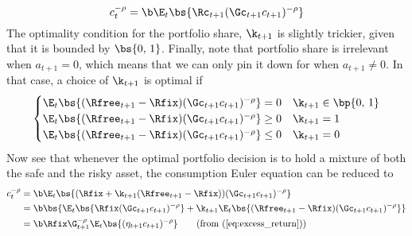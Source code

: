 \begin{equation}\label{eq:euler}
    c_t^{-\rho} = \b \E_{t}\bs{\Rc_{t+1}(\Gc_{t+1}c_{t+1})^{-\rho}}
\end{equation}
The optimality condition for the portfolio share, $\k_{t+1}$ is slightly trickier, given that it is bounded by $\bs{0,\,1}$. Finally, note that portfolio share is irrelevant when $a_{t+1} = 0$, which means that we can only pin it down for when $a_{t+1} \neq 0$. In that case, a choice of $\k_{t+1}$ is optimal if
\begin{equation}\label{eq:excess_return}
    \begin{cases}
        \E_{t}\bs{(\Rfree_{t+1} - \Rfix)(\Gc_{t+1}c_{t+1})^{-\rho}} = 0 & \k_{t+1} \in \bp{0,\,1}\\
        \E_{t}\bs{(\Rfree_{t+1} - \Rfix)(\Gc_{t+1}c_{t+1})^{-\rho}} \geq 0 & \k_{t+1} = 1\\
        \E_{t}\bs{(\Rfree_{t+1} - \Rfix)(\Gc_{t+1}c_{t+1})^{-\rho}} \leq 0 & \k_{t+1} = 0
    \end{cases}
\end{equation}
Now see that whenever the optimal portfolio decision is to hold a mixture of both the safe and the risky asset, the consumption Euler equation can be reduced to
\begin{align*}
    c_{t}^{-\rho} &= \b \E_{t}\bs{(\Rfix + \k_{t+1}(\Rfree_{t+1} - \Rfix))(\Gc_{t+1}c_{t+1})^{-\rho}}\\
    &= \b \bs{\E_{t}\bs{\Rfix(\Gc_{t+1}c_{t+1})^{-\rho}} + \k_{t+1}\E_{t}\bs{(\Rfree_{t+1} - \Rfix)(\Gc_{t+1}c_{t+1})^{-\rho}}}\\
    &= \b\Rfix\G_{t+1}^{-\rho}\E_{t}\bs{(\eta_{t+1}c_{t+1})^{-\rho}} \tag{from (\ref{eq:excess_return})}
\end{align*}
